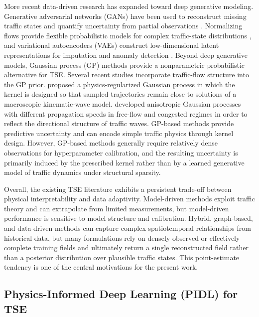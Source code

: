 \documentclass[a4paper,fleqn]{cas-sc}
\numberwithin{equation}{section}
\begin{document}
More recent data-driven research has expanded toward deep generative modeling. Generative adversarial networks (GANs) have been used to reconstruct missing traffic states and quantify uncertainty from partial observations \citep{mo2022quantifying, mo2022trafficflowgan}. Normalizing flows provide flexible probabilistic models for complex traffic-state distributions \citep{huang2023bridging}, and variational autoencoders (VAEs) construct low-dimensional latent representations for imputation and anomaly detection \citep{boquet2020variational}. Beyond deep generative models, Gaussian process (GP) methods provide a nonparametric probabilistic alternative for TSE. Several recent studies incorporate traffic-flow structure into the GP prior. \citet{yuan2021macroscopic} proposed a physics-regularized Gaussian process in which the kernel is designed so that sampled trajectories remain close to solutions of a macroscopic kinematic-wave model. \citet{wu2024traffic} developed anisotropic Gaussian processes with different propagation speeds in free-flow and congested regimes in order to reflect the directional structure of traffic waves. GP-based methods provide predictive uncertainty and can encode simple traffic physics through kernel design. However, GP-based methods generally require relatively dense observations for hyperparameter calibration, and the resulting uncertainty is primarily induced by the prescribed kernel rather than by a learned generative model of traffic dynamics under structural sparsity.

Overall, the existing TSE literature exhibits a persistent trade-off between physical interpretability and data adaptivity. Model-driven methods exploit traffic theory and can extrapolate from limited measurements, but model-driven performance is sensitive to model structure and calibration. Hybrid, graph-based, and data-driven methods can capture complex spatiotemporal relationships from historical data, but many formulations rely on densely observed or effectively complete training fields and ultimately return a single reconstructed field rather than a posterior distribution over plausible traffic states. This point-estimate tendency is one of the central motivations for the present work.

\subsection{Physics-Informed Deep Learning (PIDL) for TSE}
\end{document}

